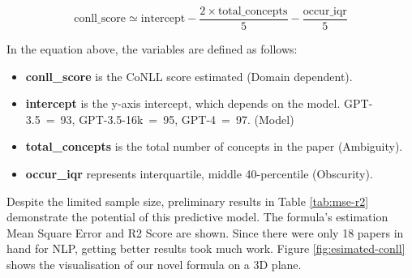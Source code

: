   \begin{equation}
      \text{conll\_score} \simeq \text{intercept} - \frac{2 \times \text{total\_concepts}}{5} - \frac{\text{occur\_iqr}}{5}
  \end{equation}\label{eq:1}
  \label{fig:conll-estimation}

In the equation above, the variables are defined as follows:
\begin{itemize}
  \item \textbf{conll\_score} is the CoNLL score estimated (Domain dependent).
  \item \textbf{intercept} is the y-axis intercept, which depends on the model. GPT-3.5~=~93, GPT-3.5-16k~=~95, GPT-4~=~97. (Model)
  \item \textbf{total\_concepts} is the total number of concepts in the paper (Ambiguity).
  \item \textbf{occur\_iqr} represents interquartile, middle 40-percentile (Obscurity).
\end{itemize}

Despite the limited sample size, preliminary results in Table \ref{tab:mse-r2} demonstrate the potential of this predictive model. The formula's estimation Mean Square Error and R2 Score are shown. Since there were only 18 papers in hand for NLP, getting better results took much work. %
Figure \ref{fig:esimated-conll} shows the visualisation of our novel formula on a 3D plane.

